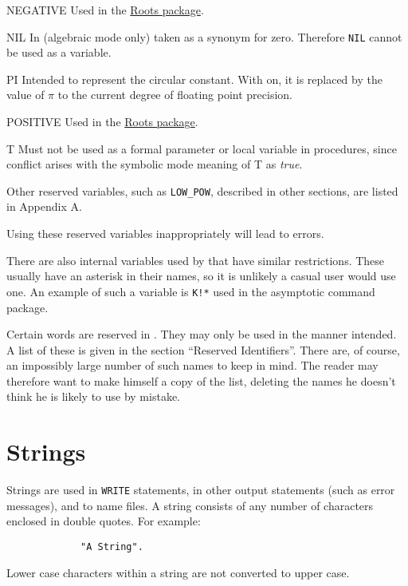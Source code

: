 \begin{list}{}
\item[NEGATIVE] Used in the \hyperlink{package:ROOTS}{Roots package}.

\item[NIL] In {\REDUCE} (algebraic mode only)
taken as a synonym for zero.  Therefore \texttt{NIL} cannot be used as a
variable.

\item[PI] Intended to represent the circular
constant.  With  on, it is replaced by the value of $\pi$ to
the current degree of floating point precision.

\item[POSITIVE] Used in the \hyperlink{package:ROOTS}{Roots package}.

\item[T] Must not be used as a formal
parameter or local variable in procedures, since conflict arises with the
symbolic mode meaning of T as \emph{true}.
\end{list}

Other reserved variables, such as \texttt{LOW\_POW}, described in other sections,
are listed in Appendix A.

Using these reserved variables inappropriately
will lead to errors.

There are also internal variables used by {\REDUCE} that have similar
restrictions. These usually have an asterisk in their names, so it is
unlikely a casual user would use one. An example of such a variable is
\texttt{K!*} used in the asymptotic command package.

Certain words are reserved in {\REDUCE}. They may only be used in the manner
intended. A list of these is given in the section ``Reserved Identifiers''.
There are, of course, an impossibly large number of such names to keep in
mind. The reader may therefore want to make himself a copy of the list,
deleting the names he doesn't think he is likely to use by mistake.

\section{Strings}

Strings are used in \texttt{WRITE} statements, in other
output statements (such as error messages), and to name files.  A string
consists of any number of characters enclosed in double quotes.  For example:
\begin{verbatim}
             "A String".
\end{verbatim}
Lower case characters within a string are not converted to upper case.

